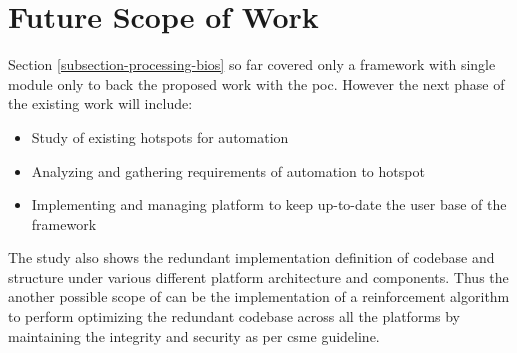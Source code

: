 \section{Future Scope of Work}\label{section-future-scope}
Section \ref{subsection-processing-bios} so far covered only a framework with single module only to back the proposed work with the \gls{poc}. 
However the next phase of the existing work will include:
\begin{itemize}
	\item Study of existing hotspots for automation
	\item Analyzing and gathering requirements of automation to hotspot
	\item Implementing and managing platform to keep up-to-date the user base of the framework
\end{itemize}

The study also shows the redundant implementation definition of codebase and structure under various different platform architecture and components. Thus the another possible scope of can be the implementation of a reinforcement algorithm to perform optimizing the redundant codebase across all the platforms by maintaining the integrity and security as per \gls{csme} guideline.
